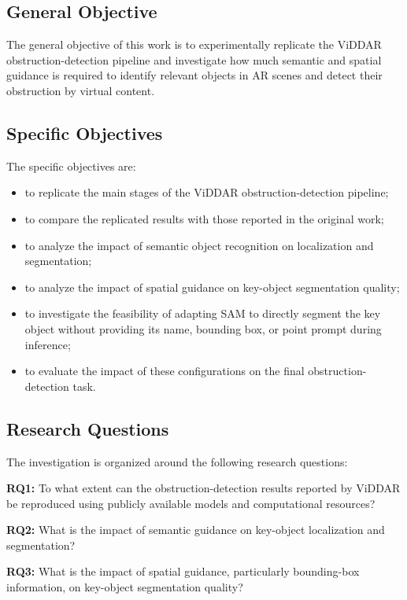 \documentclass[conference]{IEEEtran}
\begin{document}
\subsection{General Objective}

The general objective of this work is to experimentally replicate the ViDDAR obstruction-detection pipeline and investigate how much semantic and spatial guidance is required to identify relevant objects in AR scenes and detect their obstruction by virtual content.

\subsection{Specific Objectives}

The specific objectives are:

\begin{itemize}
    \item to replicate the main stages of the ViDDAR obstruction-detection pipeline;
    \item to compare the replicated results with those reported in the original work;
    \item to analyze the impact of semantic object recognition on localization and segmentation;
    \item to analyze the impact of spatial guidance on key-object segmentation quality;
    \item to investigate the feasibility of adapting SAM to directly segment the key object without providing its name, bounding box, or point prompt during inference;
    \item to evaluate the impact of these configurations on the final obstruction-detection task.
\end{itemize}

\subsection{Research Questions}

The investigation is organized around the following research questions:

\textbf{RQ1:} To what extent can the obstruction-detection results reported by ViDDAR be reproduced using publicly available models and computational resources?

\textbf{RQ2:} What is the impact of semantic guidance on key-object localization and segmentation?

\textbf{RQ3:} What is the impact of spatial guidance, particularly bounding-box information, on key-object segmentation quality?
\end{document}
